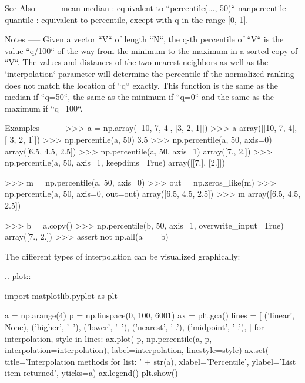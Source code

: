 \begin{DoxyVerb}
See Also
--------
mean
median : equivalent to ``percentile(..., 50)``
nanpercentile
quantile : equivalent to percentile, except with q in the range [0, 1].

Notes
-----
Given a vector ``V`` of length ``N``, the q-th percentile of
``V`` is the value ``q/100`` of the way from the minimum to the
maximum in a sorted copy of ``V``. The values and distances of
the two nearest neighbors as well as the `interpolation` parameter
will determine the percentile if the normalized ranking does not
match the location of ``q`` exactly. This function is the same as
the median if ``q=50``, the same as the minimum if ``q=0`` and the
same as the maximum if ``q=100``.

Examples
--------
>>> a = np.array([[10, 7, 4], [3, 2, 1]])
>>> a
array([[10,  7,  4],
       [ 3,  2,  1]])
>>> np.percentile(a, 50)
3.5
>>> np.percentile(a, 50, axis=0)
array([6.5, 4.5, 2.5])
>>> np.percentile(a, 50, axis=1)
array([7.,  2.])
>>> np.percentile(a, 50, axis=1, keepdims=True)
array([[7.],
       [2.]])

>>> m = np.percentile(a, 50, axis=0)
>>> out = np.zeros_like(m)
>>> np.percentile(a, 50, axis=0, out=out)
array([6.5, 4.5, 2.5])
>>> m
array([6.5, 4.5, 2.5])

>>> b = a.copy()
>>> np.percentile(b, 50, axis=1, overwrite_input=True)
array([7.,  2.])
>>> assert not np.all(a == b)

The different types of interpolation can be visualized graphically:

.. plot::

    import matplotlib.pyplot as plt

    a = np.arange(4)
    p = np.linspace(0, 100, 6001)
    ax = plt.gca()
    lines = [
        ('linear', None),
        ('higher', '--'),
        ('lower', '--'),
        ('nearest', '-.'),
        ('midpoint', '-.'),
    ]
    for interpolation, style in lines:
        ax.plot(
            p, np.percentile(a, p, interpolation=interpolation),
            label=interpolation, linestyle=style)
    ax.set(
        title='Interpolation methods for list: ' + str(a),
        xlabel='Percentile',
        ylabel='List item returned',
        yticks=a)
    ax.legend()
    plt.show()\end{DoxyVerb}
 \mbox{\label{namespacenumpy_1_1lib_1_1function__base_a91e594cc6c10d304c1d5044ba291d48e}} 

